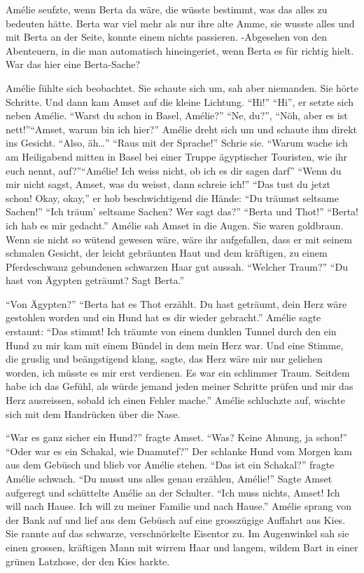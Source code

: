 \documentclass[11pt,titlepage,a5paper]{book}
\begin{document}
Amélie seufzte, wenn Berta da wäre, die wüsste bestimmt, was das alles zu bedeuten hätte. Berta war viel mehr als nur ihre alte Amme, sie wusste alles und mit Berta an der Seite, konnte einem nichts passieren. -Abgesehen von den Abenteuern, in die man automatisch hineingeriet, wenn Berta es für richtig hielt. War das hier eine Berta-Sache?

Amélie fühlte sich beobachtet. Sie schaute sich um, sah aber niemanden. Sie hörte Schritte. Und dann kam Amset auf die kleine Lichtung. "`Hi!"' "`Hi"', er setzte sich neben Amélie. "`Warst du schon in Basel, Amélie?"' "`Ne, du?"', "`Nöh, aber es ist nett!"'"`Amset, warum bin ich hier?"' Amélie dreht sich um und schaute ihm direkt ins Gesicht. "`Also, äh\dots"' "`Raus mit der Sprache!"' Schrie sie. "`Warum wache ich am Heiligabend mitten in Basel bei einer Truppe ägyptischer Touristen, wie ihr euch nennt, auf?"'"`Amélie! Ich weiss nicht, ob ich es dir sagen darf"' "`Wenn du mir nicht sagst, Amset, was du weisst, dann schreie ich!"' "`Das tust du jetzt schon! Okay, okay,"' er hob beschwichtigend die Hände: "`Du träumst seltsame Sachen!"' "`Ich träum' seltsame Sachen? Wer sagt das?"' "`Berta und Thot!"' "`Berta! ich hab es mir gedacht."' Amélie sah Amset in die Augen. Sie waren goldbraun. Wenn sie nicht so wütend gewesen wäre, wäre ihr aufgefallen, dass er mit seinem schmalen Gesicht, der leicht gebräunten Haut und dem kräftigen, zu einem Pferdeschwanz gebundenen schwarzen Haar gut aussah. "`Welcher Traum?"' "`Du hast von Ägypten geträumt? Sagt Berta."' 

"`Von Ägypten?"' "`Berta hat es Thot erzählt. Du hast geträumt, dein Herz wäre gestohlen worden und ein Hund hat es dir wieder gebracht."' Amélie sagte erstaunt: "`Das stimmt! Ich träumte von einem dunklen Tunnel durch den ein Hund zu mir kam mit einem Bündel in dem mein Herz war. Und eine Stimme, die gruslig und beängstigend klang, sagte, das Herz wäre mir nur geliehen worden, ich müsste es mir erst verdienen. Es war ein schlimmer Traum. Seitdem habe ich das Gefühl, als würde jemand jeden meiner Schritte prüfen und mir das Herz ausreissen, sobald ich einen Fehler mache."' Amélie schluchzte auf, wischte sich mit dem Handrücken über die Nase.

"`War es ganz sicher ein Hund?"' fragte Amset. "`Was? Keine Ahnung, ja schon!"' "`Oder war es ein Schakal, wie Duamutef?"' Der schlanke Hund vom Morgen kam aus dem Gebüsch und blieb vor Amélie stehen. "`Das ist ein Schakal?"' fragte Amélie schwach. "`Du musst uns alles genau erzählen, Amélie!"' Sagte Amset aufgeregt und schüttelte Amélie an der Schulter. "`Ich muss nichts, Amset! Ich will nach Hause. Ich will zu meiner Familie und nach Hause."' Amélie sprang von der Bank auf und lief aus dem Gebüsch auf eine grosszügige Auffahrt aus Kies. Sie rannte auf das schwarze, verschnörkelte Eisentor zu. Im Augenwinkel sah sie einen grossen, kräftigen Mann mit wirrem Haar und langem, wildem Bart in einer grünen Latzhose, der den Kies harkte.
\end{document}
